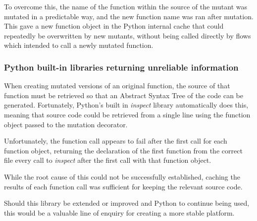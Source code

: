 To overcome this, the name of the function within the source of the mutant was mutated in a predictable way, and the new function name was ran after mutation. This gave a new function object in the Python internal cache that could repeatedly be overwritten by new mutants, without being called directly by flows which intended to call a newly mutated function. \par

\subsubsection{Python built-in libraries returning unreliable information}
When creating mutated versions of an original function, the source of that function must be retrieved so that an Abstract Syntax Tree of the code can be generated. Fortunately, Python's built in \emph{inspect} library automatically does this, meaning that source code could be retrieved from a single line using the function object passed to the mutation decorator. \par

Unfortunately, the function call appears to fail after the first call for each function object, returning the declaration of the first function from the correct file every call to \emph{inspect} after the first call with that function object. \par

While the root cause of this could not be successfully established, caching the results of each function call was sufficient for keeping the relevant source code. \par

Should this library be extended or improved and Python to continue being used, this would be a valuable line of enquiry for creating a more stable platform.\par
